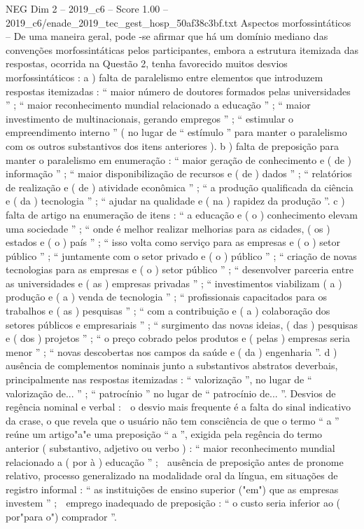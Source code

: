 \begin{textsample}{NEG Dim 2 – 2019\_c6 – Score 1.00 – 2019\_c6/enade\_2019\_tec\_gest\_hosp\_50af38c3bf.txt}
Aspectos morfossintáticos – De uma maneira geral, pode -se afirmar que há um domínio mediano das convenções morfossintáticas pelos participantes, embora a estrutura itemizada das respostas, ocorrida na Questão 2, tenha favorecido muitos desvios morfossintáticos : a ) falta de paralelismo entre elementos que introduzem respostas itemizadas : “ maior número de doutores formados pelas universidades ” ; “ maior reconhecimento mundial relacionado a educação ” ; “ maior investimento de multinacionais, gerando empregos ” ; “ estimular o empreendimento interno ” ( no lugar de “ estímulo ” para manter o paralelismo com os outros substantivos dos itens anteriores ). b ) falta de preposição para manter o paralelismo em enumeração : “ maior geração de conhecimento e ( de ) informação ” ; “ maior disponibilização de recursos e ( de ) dados ” ; “ relatórios de realização e ( de ) atividade econômica ” ; “ a produção qualificada da ciência e ( da ) tecnologia ” ; “ ajudar na qualidade e ( na ) rapidez da produção ”. c ) falta de artigo na enumeração de itens : “ a educação e ( o ) conhecimento elevam uma sociedade ” ; “ onde é melhor realizar melhorias para as cidades, ( os ) estados e ( o ) país ” ; “ isso volta como serviço para as empresas e ( o ) setor público ” ; “ juntamente com o setor privado e ( o ) público ” ; “ criação de novas tecnologias para as empresas e ( o ) setor público ” ; “ desenvolver parceria entre as universidades e ( as ) empresas privadas ” ; “ investimentos viabilizam ( a ) produção e ( a ) venda de tecnologia ” ; “ profissionais capacitados para os trabalhos e ( as ) pesquisas ” ; “ com a contribuição e ( a ) colaboração dos setores públicos e empresariais ” ; “ surgimento das novas ideias, ( das ) pesquisas e ( dos ) projetos ” ; “ o preço cobrado pelos produtos e ( pelas ) empresas seria menor ” ; “ novas descobertas nos campos da saúde e ( da ) engenharia ”. d ) ausência de complementos nominais junto a substantivos abstratos deverbais, principalmente nas respostas itemizadas : “ valorização ”, no lugar de “ valorização de... ” ; “ patrocínio ” no lugar de “ patrocínio de... ”.
Desvios de regência nominal e verbal :  o desvio mais frequente é a falta do sinal indicativo da crase, o que revela que o usuário não tem consciência de que o termo “ a ” reúne um artigo"a"e uma preposição “ a ”, exigida pela regência do termo anterior ( substantivo, adjetivo ou verbo ) : “ maior reconhecimento mundial relacionado a ( por à ) educação ” ;  ausência de preposição antes de pronome relativo, processo generalizado na modalidade oral da língua, em situações de registro informal : “ as instituições de ensino superior ("em") que as empresas investem ” ;  emprego inadequado de preposição : “ o custo seria inferior ao ( por"para o") comprador ”.

\end{textsample}
